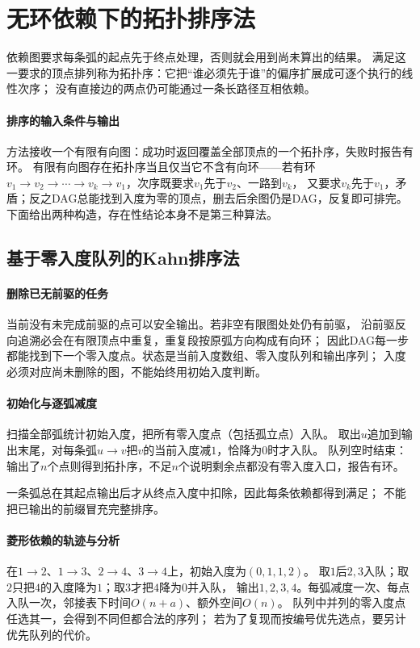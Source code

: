 \section{无环依赖下的拓扑排序法}
\label{sec:graph-theory-topological-order}

依赖图要求每条弧的起点先于终点处理，否则就会用到尚未算出的结果。
满足这一要求的顶点排列称为拓扑序：它把“谁必须先于谁”的偏序扩展成可逐个执行的线性次序；
没有直接边的两点仍可能通过一条长路径互相依赖。

\paragraph{排序的输入条件与输出}
方法接收一个有限有向图：成功时返回覆盖全部顶点的一个拓扑序，失败时报告有环。
有限有向图存在拓扑序当且仅当它不含有向环——若有环
$v_1\to v_2\to\cdots\to v_k\to v_1$，次序既要求$v_1$先于$v_2$、一路到$v_k$，
又要求$v_k$先于$v_1$，矛盾；反之DAG总能找到入度为零的顶点，删去后余图仍是DAG，反复即可排完。
下面给出两种构造，存在性结论本身不是第三种算法。

\subsection{基于零入度队列的Kahn排序法}

\paragraph{删除已无前驱的任务}
当前没有未完成前驱的点可以安全输出。若非空有限图处处仍有前驱，
沿前驱反向追溯必会在有限顶点中重复，重复段按原弧方向构成有向环；
因此DAG每一步都能找到下一个零入度点。状态是当前入度数组、零入度队列和输出序列；
入度必须对应尚未删除的图，不能始终用初始入度判断。

\paragraph{初始化与逐弧减度}
\begin{algorithm}[Kahn拓扑排序]
  扫描全部弧统计初始入度，把所有零入度点（包括孤立点）入队。
  取出$u$追加到输出末尾，对每条弧$u\to v$把$v$的当前入度减$1$，恰降为$0$时才入队。
  队列空时结束：输出了$n$个点则得到拓扑序，不足$n$个说明剩余点都没有零入度入口，报告有环。
\end{algorithm}
一条弧总在其起点输出后才从终点入度中扣除，因此每条依赖都得到满足；
不能把已输出的前缀冒充完整排序。

\paragraph{菱形依赖的轨迹与分析}
在$1\to2$、$1\to3$、$2\to4$、$3\to4$上，初始入度为$(0,1,1,2)$。
取$1$后$2,3$入队；取$2$只把$4$的入度降为$1$；取$3$才把$4$降为$0$并入队，
输出$1,2,3,4$。每弧减度一次、每点入队一次，邻接表下时间$O(n+a)$、额外空间$O(n)$。
队列中并列的零入度点任选其一，会得到不同但都合法的序列；
若为了复现而按编号优先选点，要另计优先队列的代价。


